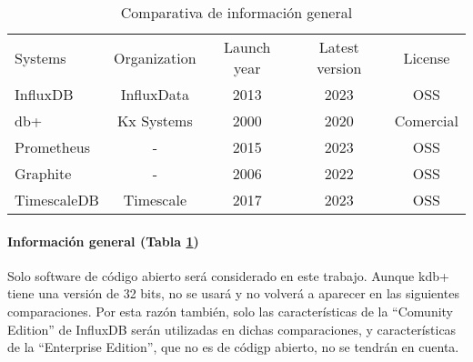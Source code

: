 \begin{table}[H]
    \begin{center}
        \begin{adjustbox}{max width=\textwidth}
            \begin{tabular}{l c c c c}
                \toprule
                Systems & Organization & Launch year & Latest version & License \\
                \otoprule
                InfluxDB    & InfluxData & 2013 & 2023 & OSS \\
                db+        & Kx Systems & 2000 & 2020 & Comercial \\
                Prometheus  & -          & 2015 & 2023 & OSS \\
                Graphite    & -          & 2006 & 2022 & OSS \\
                TimescaleDB & Timescale  & 2017 & 2023 & OSS \\
                \bottomrule
            \end{tabular}
        \end{adjustbox}
        \caption{Comparativa de información general}
        \label{tabla:gisgbd}
    \end{center}
\end{table}

\paragraph{Información general (Tabla \ref*{tabla:gisgbd})} Solo software de código abierto será considerado en este
trabajo. Aunque kdb+ tiene una versión de 32 bits, no se usará y no volverá a aparecer en las siguientes comparaciones.
Por esta razón también, solo las características de la ``Comunity Edition'' de InfluxDB serán utilizadas en dichas
comparaciones, y características de la ``Enterprise Edition'', que no es de códigp abierto, no se tendrán en cuenta.

